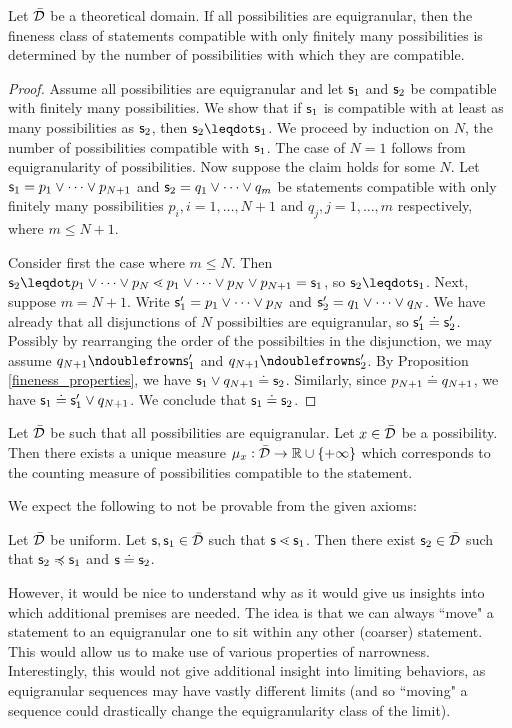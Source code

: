 \documentclass[10pt, onecolumn, longbibliography, nofootinbib]{revtex4-2}
\begin{document}
\begin{prop}
	Let $\bar{\mathcal{D}}$ be a theoretical domain. If all possibilities are equigranular, then the fineness class of statements compatible with only finitely many possibilities is determined by the number of possibilities with which they are compatible.
\end{prop}
\begin{proof}
	Assume all possibilities are equigranular and let $\mathsf{s}_1$ and $\mathsf{s}_2$ be compatible with finitely many possibilities. We show that if $\mathsf{s}_1$ is compatible with at least as many possibilities as $\mathsf{s}_2$, then $\stmt_2\finer\stmt_1$. We proceed by induction on $N$, the number of possibilities compatible with $\mathsf{s}_1$. The case of $N=1$ follows from equigranularity of possibilities. Now suppose the claim holds for some $N$. Let $\mathsf{s}_1 = p_1\vee\cdots\vee p_{N+1}$ and $\mathsf{s}_2 = q_1\vee\cdots\vee q_m$ be statements compatible with only finitely many possibilities $p_i,i=1,\ldots,N+1$ and $q_j,j=1,\ldots,m$ respectively, where $m\leq N+1$. 
	
	Consider first the case where $m\leq N$. Then $\stmt_2 \finer p_1\OR\cdots\OR p_N \sfiner p_1\OR\cdots\OR p_N\OR p_{N+1} = \stmt_1$, so $\stmt_2\finer\stmt_1$. Next, suppose $m=N+1$. Write $\mathsf{s}_1' = p_1\vee\cdots\vee p_N$ and $\mathsf{s}_2' = q_1\vee\cdots\vee q_N$. We have already that all disjunctions of $N$ possibilties are equigranular, so $\mathsf{s}_1'\doteq\mathsf{s}_2'$. Possibly by rearranging the order of the possibilties in the disjunction, we may assume $q_{N+1}\ncomp\stmt_1'$ and $q_{N+1}\ncomp\stmt_2'$. By Proposition \ref{fineness_properties}, we have $\mathsf{s}_1\vee q_{N+1}\doteq\mathsf{s}_2$. Similarly, since $p_{N+1}\doteq q_{N+1}$, we have $\mathsf{s}_1\doteq\mathsf{s}_1'\vee q_{N+1}$. We conclude that $\mathsf{s}_1\doteq\mathsf{s}_2$. 
\end{proof}


\begin{coro}
	Let $\bar{\mathcal{D}}$ be such that all possibilities are equigranular. Let $x \in \bar{\mathcal{D}}$ be a possibility. Then there exists a unique measure $\mu_{x} : \bar{\mathcal{D}} \to \mathbb{R} \cup \{+\infty\}$ which corresponds to the counting measure of possibilities compatible to the statement.
\end{coro}

We expect the following to not be provable from the given axioms:

\begin{desid}\label{uniformconsequence}
    Let $\bar{\mathcal{D}}$ be uniform. Let $\mathsf{s}, \mathsf{s}_1 \in \bar{\mathcal{D}}$ such that $\mathsf{s} \lessdot \mathsf{s}_1$. Then there exist $\mathsf{s}_2 \in \bar{\mathcal{D}}$ such that $\mathsf{s}_2 \preccurlyeq \mathsf{s}_1$ and $\mathsf{s} \doteq \mathsf{s}_2$.
\end{desid}
However, it would be nice to understand why as it would give us insights into which additional premises are needed. The idea is that we can always ``move" a statement to an equigranular one to sit within any other (coarser) statement. This would allow us to make use of various properties of narrowness. Interestingly, this would not give additional insight into limiting behaviors, as equigranular sequences may have vastly different limits (and so ``moving" a sequence could drastically change the equigranularity class of the limit).
\end{document}
